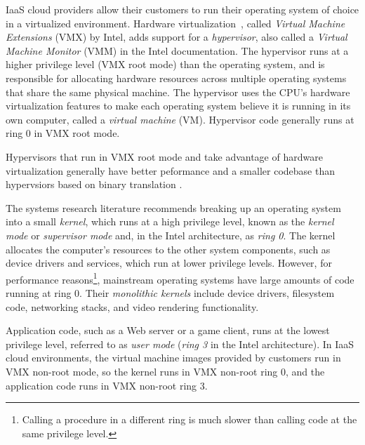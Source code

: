 IaaS cloud providers allow their customers to run their operating system of
choice in a virtualized environment. Hardware
virtualization~\cite{uhlig2005vmx}, called \textit{Virtual Machine Extensions}
(VMX) by Intel, adds support for a \textit{hypervisor}, also called a
\textit{Virtual Machine Monitor} (VMM) in the Intel documentation. The
hypervisor runs at a higher privilege level (VMX root mode) than the operating
system, and is responsible for allocating hardware resources across multiple
operating systems that share the same physical machine. The hypervisor uses the
CPU's hardware virtualization features to make each operating system believe it
is running in its own computer, called a \textit{virtual machine} (VM).
Hypervisor code generally runs at ring 0 in VMX root mode.

Hypervisors that run in VMX root mode and take advantage of hardware
virtualization generally have better peformance and a smaller codebase than
hypervsiors based on binary translation \cite{rosenblum2005virtualization}.

The systems research literature recommends breaking up an operating system into
a small \textit{kernel}, which runs at a high privilege level, known as the
\textit{kernel mode} or \textit{supervisor mode} and, in the Intel
architecture, as \textit{ring 0}. The kernel allocates the computer's resources
to the other system components, such as device drivers and services, which run
at lower privilege levels. However, for performance reasons\footnote{Calling a
procedure in a different ring is much slower than calling code at the same
privilege level.}, mainstream operating systems have large amounts of code
running at ring 0. Their \textit{monolithic kernels} include device drivers,
filesystem code, networking stacks, and video rendering functionality.

Application code, such as a Web server or a game client, runs at the lowest
privilege level, referred to as \textit{user mode} (\textit{ring 3} in the
Intel architecture). In IaaS cloud environments, the virtual machine images
provided by customers run in VMX non-root mode, so the kernel runs in VMX
non-root ring 0, and the application code runs in VMX non-root ring 3.

